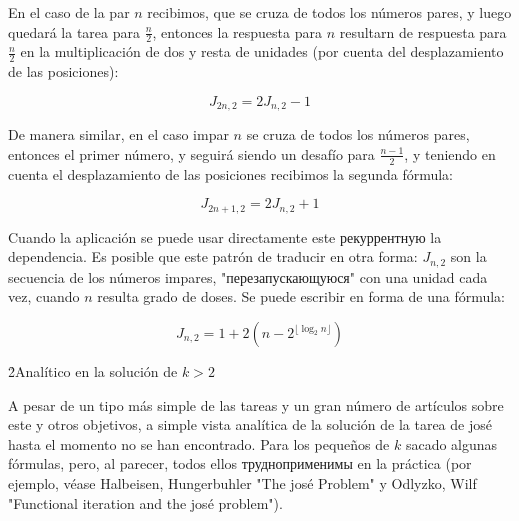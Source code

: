 En el caso de la par $n$ recibimos, que se cruza de todos los números pares, y luego quedará la tarea para $\frac{n}{2}$, entonces la respuesta para $n$ resultarn de respuesta para $\frac{n}{2}$ en la multiplicación de dos y resta de unidades (por cuenta del desplazamiento de las posiciones):

$$ J_{2n,2} = 2 J_{n,2} - 1 $$

De manera similar, en el caso impar $n$ se cruza de todos los números pares, entonces el primer número, y seguirá siendo un desafío para $\frac{n-1}{2}$, y teniendo en cuenta el desplazamiento de las posiciones recibimos la segunda fórmula:

$$ J_{2n+1,2} = 2 J_{n,2} + 1 $$

Cuando la aplicación se puede usar directamente este рекуррентную la dependencia. Es posible que este patrón de traducir en otra forma: $J_{n,2}$ son la secuencia de los números impares, "перезапускающуюся" con una unidad cada vez, cuando $n$ resulta grado de doses. Se puede escribir en forma de una fórmula:

$$ J_{n,2} = 1 + 2 \left( n - 2^{\lfloor \log_2 n \rfloor} \right) $$

\h2{Analítico en la solución de $k>2$}

A pesar de un tipo más simple de las tareas y un gran número de artículos sobre este y otros objetivos, a simple vista analítica de la solución de la tarea de josé hasta el momento no se han encontrado. Para los pequeños de $k$ sacado algunas fórmulas, pero, al parecer, todos ellos трудноприменимы en la práctica (por ejemplo, véase Halbeisen, Hungerbuhler "The josé Problem" y Odlyzko, Wilf "Functional iteration and the josé problem").